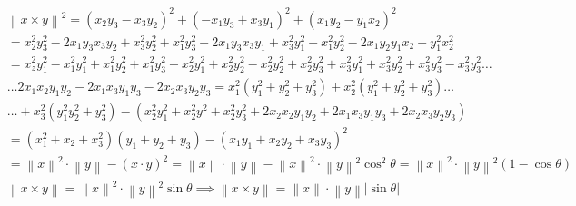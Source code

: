 \begin{exercise}[Si $x,y \in \R^3\implies \left\lVert x\times y\right\rVert=\left\lVert x\right\rVert\left\lVert y\right\rVert \left\lvert \sin \theta \right\rvert $]
	\begin{align*}
		 & \left\lVert x\times y\right\rVert^2=\left(x_2y_3-x_3y_2\right)^2+\left(-x_1y_3+x_3y_1\right)^2+\left(x_1y_2-y_1x_2\right)^2                                                                                                                                                                                    \\
		 & =x_2^2y_3^2-2x_1y_3x_3y_2+x_3^2y_2^2+x_1^2y_3^2-2x_1y_3x_3y_1+x_3^2y_1^2+x_1^2y_2^2-2x_1y_2y_1x_2+y_1^2x_2^2                                                                                                                                                                                                   \\
		 & =x_z^2y_1^2-x_1^2y_1^2+x_1^2y_2^2+x_1^2y_3^2+x_2^2y_1^2+x_2^2y_2^2-x_2^2y_2^2+x_2^2y_3^2+x_3^2y_1^2+x_3^2y_2^2+x_3^2y_3^2-x_3^2y_3^2\dots                                                                                                                                                                      \\
		 & \dots 2x_1x_2y_1y_2-2x_1x_3y_1y_3-2x_2x_3y_2y_3=x_1^2\left( y_1^2+y_2^2+y_3^2\right)+x_2^2\left(y_1^2+y_2^2+y_3^2\right)\dots                                                                                                                                                                                  \\
		 & \dots+x_3^2\left(y_1^2y_2^2+y_3^2\right)-\left(x_2^2y_1^2+x_2^2y^2+x_2^2y_3^2+2x_2x_2y_1y_2+ 2x_1x_3y_1y_3+2x_2x_3y_2y_3\right)                                                                                                                                                                                \\
		 & =\left(x_1^2+x_2+x_3^2\right)\left(y_1+y_2+y_3\right)-\left(x_1y_1+x_2y_2+x_3y_3\right)^2                                                                                                                                                                                                                      \\
		 & =\left\lVert x\right\rVert^2\cdot \left\lVert y\right\rVert -\left(x\cdot y\right)^2=\left\lVert x\right\rVert \cdot \left\lVert y\right\rVert -\left\lVert x\right\rVert^2\cdot \left\lVert y\right\rVert^2\cos^2\theta=\left\lVert x\right\rVert^2\cdot \left\lVert y\right\rVert^2\left(1-\cos\theta\right) \\
		 & \left\lVert x\times y\right\rVert=\left\lVert x\right\rVert^2 \cdot \left\lVert y\right\rVert^2\sin{\theta}\implies \left\lVert x\times y\right\rVert=\left\lVert x\right\rVert \cdot \left\lVert y\right\rVert \left\lvert \sin{\theta} \right\rvert
	\end{align*}
\end{exercise}

